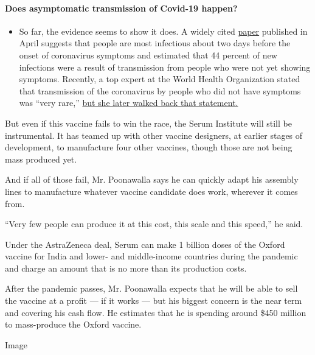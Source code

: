 \begin{itemize}
{  \paragraph{Does asymptomatic transmission of Covid-19
  happen?}\label{does-asymptomatic-transmission-of-covid-19-happen}}

  \begin{itemize}
  \tightlist
  \item
    So far, the evidence seems to show it does. A widely cited
    \href{https://www.nature.com/articles/s41591-020-0869-5}{paper}
    published in April suggests that people are most infectious about
    two days before the onset of coronavirus symptoms and estimated that
    44 percent of new infections were a result of transmission from
    people who were not yet showing symptoms. Recently, a top expert at
    the World Health Organization stated that transmission of the
    coronavirus by people who did not have symptoms was ``very rare,''
    \href{https://www.nytimes3xbfgragh.onion/2020/06/09/world/coronavirus-updates.html?action=click\&pgtype=Article\&state=default\&region=MAIN_CONTENT_3\&context=storylines_faq\#link-1f302e21}{but
    she later walked back that statement.}
  \end{itemize}
\end{itemize}

But even if this vaccine fails to win the race, the Serum Institute will
still be instrumental. It has teamed up with other vaccine designers, at
earlier stages of development, to manufacture four other vaccines,
though those are not being mass produced yet.

And if all of those fail, Mr. Poonawalla says he can quickly adapt his
assembly lines to manufacture whatever vaccine candidate does work,
wherever it comes from.

``Very few people can produce it at this cost, this scale and this
speed,'' he said.

Under the AstraZeneca deal, Serum can make 1 billion doses of the Oxford
vaccine for India and lower- and middle-income countries during the
pandemic and charge an amount that is no more than its production costs.

After the pandemic passes, Mr. Poonawalla expects that he will be able
to sell the vaccine at a profit --- if it works --- but his biggest
concern is the near term and covering his cash flow. He estimates that
he is spending around \$450 million to mass-produce the Oxford vaccine.

Image

